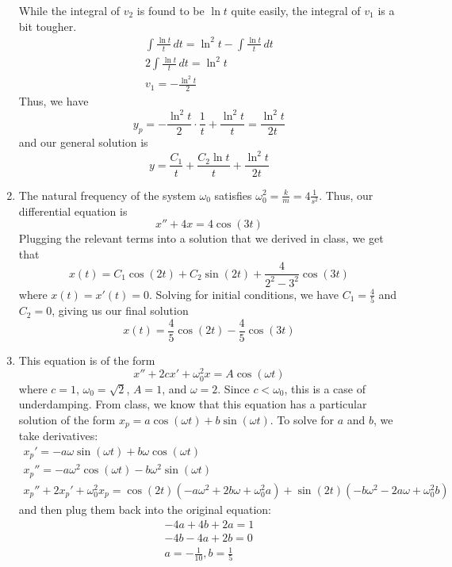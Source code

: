 \documentclass[12pt]{article}
\begin{document}
\begin{enumerate}
          While the integral of $v_2$ is found to be $\ln t$ quite easily,
          the integral of $v_1$ is a bit tougher.
          \begin{gather*}
              \int \frac{\ln t}{t}\,dt=\ln^2 t - \int \frac{\ln t}{t}\,dt \\
              2\int \frac{\ln t}{t}\,dt = \ln^2 t \\
              v_1=-\frac{\ln^2 t}{2}
          \end{gather*}
          Thus, we have
          \[y_p=-\frac{\ln^2 t}{2} \cdot \frac{1}{t}+\frac{\ln^2 t}{t}=\frac{\ln^2 t}{2t}\]
          and our general solution is
          \[y=\frac{C_1}{t}+\frac{C_2 \ln t}{t}+\frac{\ln^2 t}{2t}\]
    \item The natural frequency of the system $\omega_0$ satisfies $ \omega_0^2=\frac{k}{m}=4 \frac{1}{s^2}$.
          Thus, our differential equation is
          \[x''+4 x = 4 \cos (3t)\]
          Plugging the relevant terms into a solution that we derived in class, we get that
          \[x(t)=C_1\cos(2t)+C_2\sin(2t)+\frac{4}{2^2-3^2}\cos(3t)\]
          where $x(t)=x'(t)=0$.
          Solving for initial conditions, we have $C_1=\frac{4}{5}$ and $C_2=0$, giving us our final solution
          \[x(t)=\frac{4}{5}\cos(2t)-\frac{4}{5}\cos(3t)\]
    \item This equation is of the form
          \[x''+2cx'+\omega_0^2x=A\cos(\omega t)\]
          where $c=1$, $\omega_0=\sqrt{2}$, $A=1$, and $\omega=2$.
          Since $c < \omega_0$, this is a case of underdamping.
          From class, we know that this equation has a particular solution of the form $x_p=a\cos(\omega t)+b\sin(\omega t)$.
          To solve for $a$ and $b$, we take derivatives:
          \begin{gather*}
              x_p'=-a\omega\sin(\omega t)+b\omega\cos(\omega t) \\
              x_p''=-a\omega^2\cos(\omega t)-b\omega^2\sin(\omega t) \\
              x_p''+2x_p'+\omega_0^2 x_p = \cos(2t)\left(-a\omega^2+2b\omega+\omega_0^2a\right)+\sin(2t)\left(-b\omega^2-2a\omega+\omega_0^2b\right)
          \end{gather*}
          and then plug them back into the original equation:
          \begin{gather*}
              -4a+4b+2a=1 \\
              -4b-4a+2b=0 \\
              a=-\frac{1}{10},b=\frac{1}{5} \\

\end{gather*}
\end{enumerate}
\end{document}
